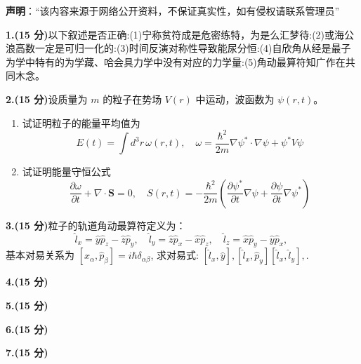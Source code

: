 
\textbf{声明}：“该内容来源于网络公开资料，不保证真实性，如有侵权请联系管理员”

\textbf{1.(15 分)}以下叙述是否正确:(1)宁称贫符成是危密练特，为是么汇梦待:(2)或海公浪高数一定是可归一化的:(3)时间反演对称性导致能尿分恒:(4)自欣角从经是最子为学中特有的为学藏、哈会具力学中没有对应的力学量:(5)角动最算符知广作在共同木念。

\textbf{2.(15 分)}设质量为 $m$ 的粒子在势场 $V(r)$ 中运动，波函数为 $\psi(r,t)$。

\begin{enumerate}
    \item  试证明粒子的能量平均值为
    \[
    E(t) = \int d^3r \, \omega(r,t), \quad \omega = \frac{\hbar^2}{2m} \nabla \psi^* \cdot \nabla \psi + \psi^* V \psi~
    \]
    
    \item  试证明能量守恒公式
    \[
    \frac{\partial \omega}{\partial t} + \nabla \cdot \mathbf{S} = 0, \quad S(r,t) = -\frac{\hbar^2}{2m} \left(\frac{\partial \psi^*}{\partial t} \nabla \psi + \frac{\partial \psi}{\partial t} \nabla \psi^*\right)~
    \]
\end{enumerate}
\textbf{3.(15 分)}粒子的轨道角动最算符定义为：
\[
\hat{l}_x = \hat{y} \hat{p}_z - \hat{z} \hat{p}_y, \quad \hat{l}_y = \hat{z} \hat{p}_x - \hat{x} \hat{p}_z, \quad \hat{l}_z = \hat{x} \hat{p}_y - \hat{y} \hat{p}_x,~
\]
基本对易关系为
$[\hat{x}_\alpha, \hat{p}_\beta] = i\hbar \delta_{\alpha\beta}$, 求对易式: $[\hat{l}_x, \hat{y}] ,  [\hat{l}_x, \hat{p}_y] [\hat{l}_x, \hat{l}_y] , .$

\textbf{4.(15 分)}

\textbf{5.(15 分)}

\textbf{6.(15 分)}

\textbf{7.(15 分)}